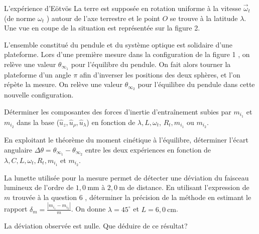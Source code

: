 \begin{exo}[PC][1][devoir]{L'expérience d'Eötvös}
La terre est supposée en rotation uniforme à la vitesse $\vec{\omega}_{t}$ (de norme $\omega_{t}$ ) autour de l'axe terrestre et le point $O$ se trouve à la latitude $\lambda$. Une vue en coupe de la situation est représentée sur la figure 2.

L'ensemble constitué du pendule et du système optique est solidaire d'une plateforme. Lors d'une première mesure dans la configuration de la figure 1 , on relève une valeur $\theta_{\infty_{1}}$ pour l'équilibre du pendule. On fait alors tourner la plateforme d'un angle $\pi$ afin d'inverser les positions des deux sphères, et l'on répète la mesure. On relève une valeur $\theta_{\infty_{2}}$ pour l'équilibre du pendule dans cette nouvelle configuration.

\begin{quest}
  \item Déterminer les composantes des forces d'inertie d'entraînement subies par $m_{i_{1}}$ et $m_{i_{2}}$ dans la base ($\widehat{u}_{z}, \widehat{u}_{\rho}, \widehat{u}_{\lambda}$) en fonction de $\lambda, L, \omega_{t}$, $R_{t}, m_{i_{1}}$ ou $m_{i_{2}}$.
  
  \item En exploitant le théorème du moment cinétique à l'équilibre, déterminer l'écart angulaire $\Delta \theta=\theta_{\infty_{1}}-\theta_{\infty_{2}}$ entre les deux expériences en fonction de $\lambda, C, L, \omega_{t}, R_{t}, m_{i_{1}}$ et $m_{i_{2}}$.
  
  \item La lunette utilisée pour la mesure permet de détecter une déviation du faisceau lumineux de l'ordre de $1,0 \mathrm{~mm}$ à $2,0 \mathrm{~m}$ de distance. En utilisant l'expression de $m$ trouvée à la question 6 , déterminer la précision de la méthode en estimant le rapport $\delta_{m}=\frac{\left|m_{i_{1}}-m_{i_{2}}\right|}{m}$. On donne $\lambda=45^{\circ}$ et $L=6,0 \mathrm{~cm}$.
  
\item La déviation observée est nulle. Que déduire de ce résultat?
\end{quest}

\end{exo}
